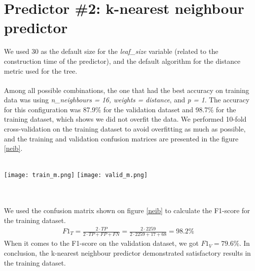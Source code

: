 \documentclass{article}
\newcommand{\enterProblemHeader}[1]{
\nobreak\extramarks{#1}{#1}\nobreak
\nobreak\extramarks{#1}{#1}\nobreak
}
\newcommand{\exitProblemHeader}[1]{
\nobreak\extramarks{#1}{#1}\nobreak
\nobreak\extramarks{#1}{}\nobreak
}
\newcounter{homeworkProblemCounter} %
\newcommand{\homeworkProblemName}{}
\newenvironment{homeworkProblem}[1][Problem \arabic{homeworkProblemCounter}]{ %
\stepcounter{homeworkProblemCounter} %
\renewcommand{\homeworkProblemName}{#1} %
\section{\homeworkProblemName} %
\enterProblemHeader{} %
}{
\exitProblemHeader{} %
}
\begin{document}
\begin{homeworkProblem}[Predictor \#2: k-nearest neighbour predictor]
We used 30 as the default size for the \textit{leaf\_size} variable (related to the construction time of the predictor), and the default algorithm for the distance metric used for the tree. 
\\
\\
Among all possible combinations, the one that had the best accuracy on training data was using  \textit{n\_neighbours = 16, weights = distance}, and \textit{p = 1}. The accuracy for this configuration was 87.9\% for the validation dataset and 98.7\% for the training dataset, which shows we did not overfit the data. We performed 10-fold cross-validation on the training dataset to avoid overfitting as much as possible, and the training and validation confusion matrices are presented in the figure \ref{neib}.
\\
\\
\begin{minipage}{\textwidth}
\centering
    \texttt{[image: train\_m.png]}
    \texttt{[image: valid\_m.png]}
 \label{neib}
\end{minipage}
\\
\\
We used the confusion matrix shown on figure \ref{neib} to calculate the F1-score for the training dataset.
\begin{gather*}
    F1_T = \frac{2\cdot TP}{2\cdot TP + FP + FN} = \frac{2\cdot 2259}{2\cdot 2259 + 17 + 68} = \boldsymbol{98.2\%}
\end{gather*}
When it comes to the F1-score on the validation dataset, we got $F1_{V} = 79.6\%$. In conclusion, the k-nearest neighbour predictor demonstrated satisfactory results in the training dataset.
\end{homeworkProblem}
\clearpage
\end{document}
